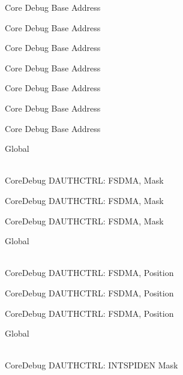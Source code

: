 \begin{DoxyRefList}
\label{deprecated__deprecated000153}%
%
Core Debug Base Address 

\label{deprecated__deprecated000229}%
%
Core Debug Base Address 

\label{deprecated__deprecated000292}%
%
Core Debug Base Address 

\label{deprecated__deprecated000371}%
%
Core Debug Base Address 

\label{deprecated__deprecated000447}%
%
Core Debug Base Address 

\label{deprecated__deprecated000550}%
%
Core Debug Base Address 

\label{deprecated__deprecated000652}%
%
Core Debug Base Address  
\item[{\parbox[t]{\linewidth}{Global \doxylink{group___c_m_s_i_s___s_c_b_gab7f3f76af0236f8d3d3a090f50d4841a}{Core\+Debug\+\_\+\+DAUTHCTRL\+\_\+\+FSDMA\+\_\+\+Msk} }}]\hfill \\
\label{deprecated__deprecated000084}%
%
Core\+Debug DAUTHCTRL\+: FSDMA, Mask 

\label{deprecated__deprecated000535}%
%
Core\+Debug DAUTHCTRL\+: FSDMA, Mask 

\label{deprecated__deprecated000637}%
%
Core\+Debug DAUTHCTRL\+: FSDMA, Mask  
\item[{\parbox[t]{\linewidth}{Global \doxylink{group___c_m_s_i_s___s_c_b_ga2b4fde73cbbbb0adeb686dc20ff705de}{Core\+Debug\+\_\+\+DAUTHCTRL\+\_\+\+FSDMA\+\_\+\+Pos} }}]\hfill \\
\label{deprecated__deprecated000083}%
%
Core\+Debug DAUTHCTRL\+: FSDMA, Position 

\label{deprecated__deprecated000534}%
%
Core\+Debug DAUTHCTRL\+: FSDMA, Position 

\label{deprecated__deprecated000636}%
%
Core\+Debug DAUTHCTRL\+: FSDMA, Position  
\item[{\parbox[t]{\linewidth}{Global \doxylink{group___c_m_s_i_s___s_c_b_ga1570f149a0f89f70fc2644a5842cbcb4}{Core\+Debug\+\_\+\+DAUTHCTRL\+\_\+\+INTSPIDEN\+\_\+\+Msk} }}]\hfill \\
\label{deprecated__deprecated000090}%
%
Core\+Debug DAUTHCTRL\+: INTSPIDEN Mask 


\end{DoxyRefList}

